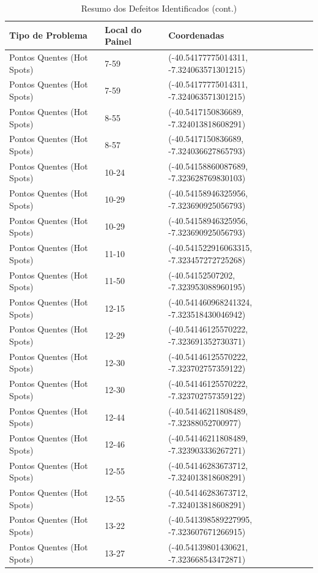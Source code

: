 \documentclass[dvipsnames]{article}%
\begin{document}
\begin{table}[h!]%
\caption{Resumo dos Defeitos Identificados (cont.)}%
\begin{tabular}{lll}%
\toprule%
Tipo de Problema&Local do Painel&Coordenadas\\%
\midrule%
Pontos Quentes (Hot Spots)&7{-}59&({-}40.54177775014311, {-}7.324063571301215)\\%
Pontos Quentes (Hot Spots)&7{-}59&({-}40.54177775014311, {-}7.324063571301215)\\%
Pontos Quentes (Hot Spots)&8{-}55&({-}40.5417150836689, {-}7.324013818608291)\\%
Pontos Quentes (Hot Spots)&8{-}57&({-}40.5417150836689, {-}7.324036627865793)\\%
Pontos Quentes (Hot Spots)&10{-}24&({-}40.54158860087689, {-}7.323628769830103)\\%
Pontos Quentes (Hot Spots)&10{-}29&({-}40.54158946325956, {-}7.323690925056793)\\%
Pontos Quentes (Hot Spots)&10{-}29&({-}40.54158946325956, {-}7.323690925056793)\\%
Pontos Quentes (Hot Spots)&11{-}10&({-}40.541522916063315, {-}7.323457272725268)\\%
Pontos Quentes (Hot Spots)&11{-}50&({-}40.54152507202, {-}7.323953088960195)\\%
Pontos Quentes (Hot Spots)&12{-}15&({-}40.541460968241324, {-}7.323518430046942)\\%
Pontos Quentes (Hot Spots)&12{-}29&({-}40.54146125570222, {-}7.323691352730371)\\%
Pontos Quentes (Hot Spots)&12{-}30&({-}40.54146125570222, {-}7.323702757359122)\\%
Pontos Quentes (Hot Spots)&12{-}30&({-}40.54146125570222, {-}7.323702757359122)\\%
Pontos Quentes (Hot Spots)&12{-}44&({-}40.54146211808489, {-}7.32388052700977)\\%
Pontos Quentes (Hot Spots)&12{-}46&({-}40.54146211808489, {-}7.323903336267271)\\%
Pontos Quentes (Hot Spots)&12{-}55&({-}40.54146283673712, {-}7.324013818608291)\\%
Pontos Quentes (Hot Spots)&12{-}55&({-}40.54146283673712, {-}7.324013818608291)\\%
Pontos Quentes (Hot Spots)&13{-}22&({-}40.541398589227995, {-}7.323607671266915)\\%
Pontos Quentes (Hot Spots)&13{-}27&({-}40.54139801430621, {-}7.323668543472871)\\%

\end{tabular}
\end{table}
\end{document}
